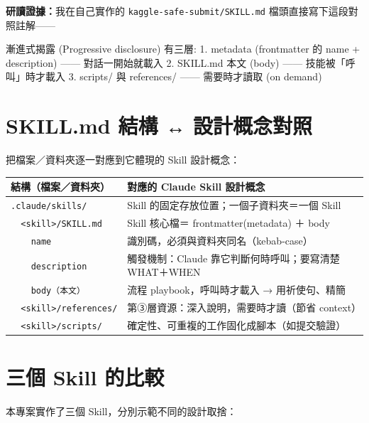 \documentclass[11pt]{ctexart}
\newenvironment{codebox}
  {\begin{shaded}\ttfamily\small\setlength{\parindent}{0pt}\obeylines}
  {\end{shaded}}
\newcommand{\code}[1]{\texttt{#1}}
\begin{document}
\vspace{0.6em}
\noindent\textbf{研讀證據：}我在自己實作的 \code{kaggle-safe-submit/SKILL.md} 檔頭直接寫下這段對照註解——
\begin{codebox}
漸進式揭露 (Progressive disclosure) 有三層:
  1. metadata (frontmatter 的 name + description) —— 對話一開始就載入
  2. SKILL.md 本文 (body) —— 技能被「呼叫」時才載入
  3. scripts/ 與 references/ —— 需要時才讀取 (on demand)
\end{codebox}

\section{SKILL.md 結構 ↔ 設計概念對照}
把檔案／資料夾逐一對應到它體現的 Skill 設計概念：

\vspace{0.4em}
\noindent\begin{tabularx}{\linewidth}{l X}
\arrayrulecolor{navy}\toprule
\rowcolor{headfill}\textbf{結構（檔案／資料夾）} & \textbf{對應的 Claude Skill 設計概念} \\
\midrule
\code{.claude/skills/}            & Skill 的固定存放位置；一個子資料夾＝一個 Skill \\
\rowcolor{rowfill}
\code{~~<skill>/SKILL.md}          & Skill 核心檔＝ frontmatter(metadata) ＋ body \\
\code{~~~~name}                    & 識別碼，必須與資料夾同名（kebab-case） \\
\rowcolor{rowfill}
\code{~~~~description}             & 觸發機制：Claude 靠它判斷何時呼叫；要寫清楚 WHAT＋WHEN \\
\code{~~~~body（本文）}            & 流程 playbook，呼叫時才載入 → 用祈使句、精簡 \\
\rowcolor{rowfill}
\code{~~<skill>/references/}       & 第③層資源：深入說明，需要時才讀（節省 context） \\
\code{~~<skill>/scripts/}         & 確定性、可重複的工作固化成腳本（如提交驗證） \\
\bottomrule
\end{tabularx}

\section{三個 Skill 的比較}
本專案實作了三個 Skill，分別示範不同的設計取捨：
\end{document}
